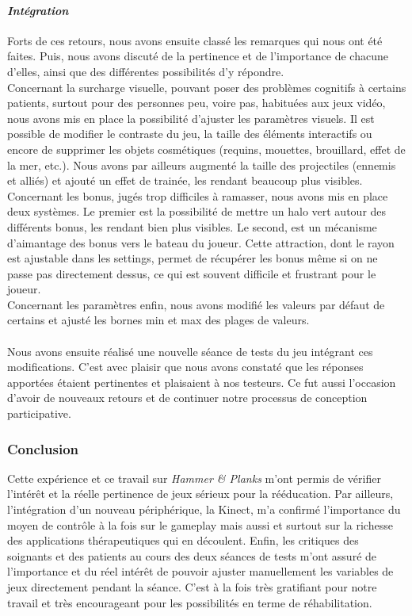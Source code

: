 	\paragraph{\emph{Intégration}\\}
	Forts de ces retours, nous avons ensuite classé les remarques qui nous ont été faites. Puis, nous avons discuté de la pertinence et de l'importance de chacune d'elles, ainsi que des différentes possibilités d'y répondre. \\
	Concernant la surcharge visuelle, pouvant poser des problèmes cognitifs à certains patients, surtout pour des personnes peu, voire pas, habituées aux jeux vidéo, nous avons mis en place la possibilité d'ajuster les paramètres visuels. Il est possible de modifier le contraste du jeu, la taille des éléments interactifs ou encore de supprimer les objets cosmétiques (requins, mouettes, brouillard, effet de la mer, etc.). Nous avons par ailleurs augmenté la taille des projectiles (ennemis et alliés) et ajouté un effet de trainée, les rendant beaucoup plus visibles.\\
	Concernant les bonus, jugés trop difficiles à ramasser, nous avons mis en place deux systèmes. Le premier est la possibilité de mettre un halo vert autour des différents bonus, les rendant bien plus visibles. Le second, est un mécanisme d'aimantage des bonus vers le bateau du joueur. Cette attraction, dont le rayon est ajustable dans les settings, permet de récupérer les bonus même si on ne passe pas directement dessus, ce qui est souvent difficile et frustrant pour le joueur.\\
Concernant les paramètres enfin, nous avons modifié les valeurs par défaut de certains et ajusté les bornes min et max des plages de valeurs.

		
	\paragraph{} Nous avons ensuite réalisé une nouvelle séance de tests du jeu intégrant ces modifications. C'est avec plaisir que nous avons constaté que les réponses apportées étaient pertinentes et plaisaient à nos testeurs. Ce fut aussi l'occasion d'avoir de nouveaux retours et de continuer notre processus de conception participative.
	
	\subsubsection*{Conclusion}
	Cette expérience et ce travail sur \emph{Hammer \& Planks} m'ont permis de vérifier l'intérêt et la réelle pertinence de jeux sérieux pour la rééducation. Par ailleurs, l'intégration d'un nouveau périphérique, la Kinect, m'a confirmé l'importance du moyen de contrôle à la fois sur le gameplay mais aussi et surtout sur la richesse des applications thérapeutiques qui en découlent. Enfin, les critiques des soignants et des patients au cours des deux séances de tests m'ont assuré de l'importance et du réel intérêt de pouvoir ajuster manuellement les variables de jeux directement pendant la séance. C'est à la fois très gratifiant pour notre travail et très encourageant pour les possibilités en terme de réhabilitation.
	
